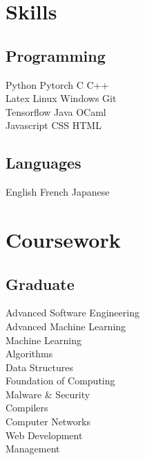 \documentclass[]{deedy-resume-openfont}
\begin{document}
%
%
\lastupdated

%
%

%
%

\begin{minipage}[t]{0.29\textwidth}


\section{Skills}
\subsection{Programming}
Python \textbullet{} Pytorch \textbullet{} C \textbullet{} C++ \\
Latex \textbullet{} Linux \textbullet{} Windows \textbullet{} Git \\
Tensorflow \textbullet{} Java \textbullet{} OCaml \\
Javascript \textbullet{} CSS \textbullet{} HTML
\sectionsep

\subsection{Languages}
English \textbullet{} French \textbullet{} Japanese


\section{Coursework}
\subsection{Graduate}
Advanced Software Engineering \\
Advanced Machine Learning \\
Machine Learning \\
Algorithms \\
Data Structures \\
Foundation of Computing \\
Malware \& Security \\
Compilers \\
Computer Networks \\
Web Development \\
Management \\
\sectionsep


\end{minipage}
\end{document}
